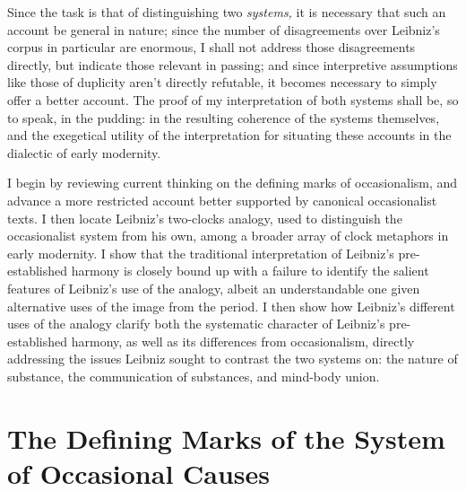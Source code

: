 \documentclass{article}
\begin{document}
Since the task is that of distinguishing two \emph{systems,} it is
necessary that such an account be general in nature; since the number of
disagreements over Leibniz's corpus in particular are enormous, I shall
not address those disagreements directly, but indicate those relevant in
passing; and since interpretive assumptions like those of duplicity
aren't directly refutable, it becomes necessary to simply offer a better
account. The proof of my interpretation of both systems shall be, so to
speak, in the pudding: in the resulting coherence of the systems
themselves, and the exegetical utility of the interpretation for
situating these accounts in the dialectic of early modernity.

I begin by reviewing current thinking on the defining marks of
occasionalism, and advance a more restricted account better supported by
canonical occasionalist texts. I then locate Leibniz's two-clocks
analogy, used to distinguish the occasionalist system from his own,
among a broader array of clock metaphors in early modernity. I show that
the traditional interpretation of Leibniz's pre-established harmony is
closely bound up with a failure to identify the salient features of
Leibniz's use of the analogy, albeit an understandable one given
alternative uses of the image from the period. I then show how Leibniz's
different uses of the analogy clarify both the systematic character of
Leibniz's pre-established harmony, as well as its differences from
occasionalism, directly addressing the issues Leibniz sought to contrast
the two systems on: the nature of substance, the communication of
substances, and mind-body union.

\section{The Defining Marks of the System of Occasional
Causes}
\end{document}
